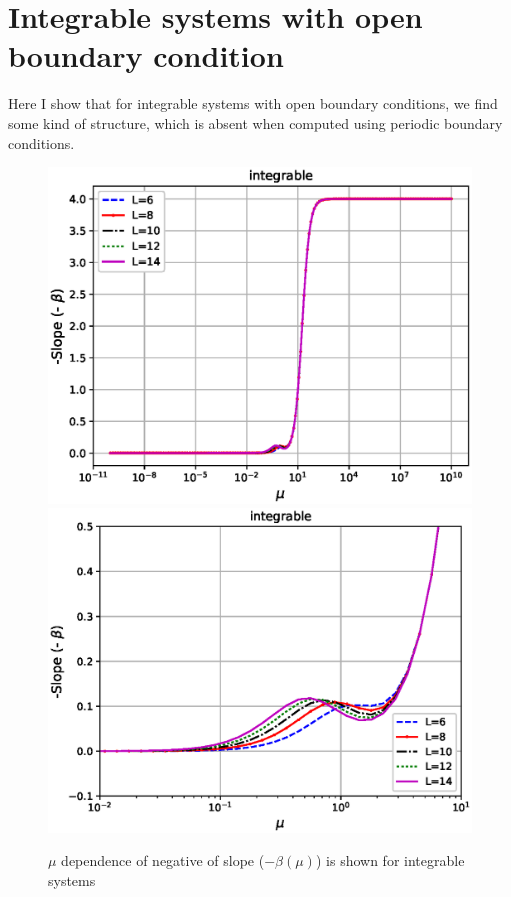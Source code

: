 \documentclass[11pt,a4paper]{article}
\begin{document}
\section{Integrable systems with open boundary condition}

Here I show that for integrable systems with open boundary conditions, we find some kind of structure, which is absent when computed using periodic boundary conditions.

\begin{figure}[ht!]
\begin{center}
\includegraphics[scale=0.5]{new_pics/v3_slope_int_semilogx.eps} 
\includegraphics[scale=0.5]{new_pics/v3_slope_int_semilogx_zoom.eps}
\caption{$\mu$ dependence of negative of slope ($-\beta (\mu)$) is shown for  integrable systems }
\label{slope_integrable_mu}
\end{center}
\end{figure}
\end{document}
